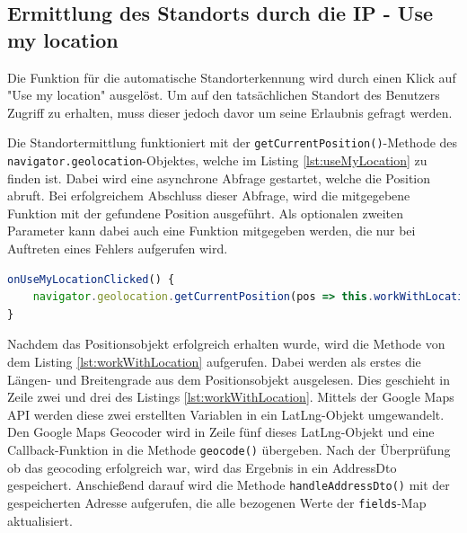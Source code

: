 \subsection{Ermittlung des Standorts durch die IP - Use my location}

Die Funktion für die automatische Standorterkennung wird durch einen Klick auf "Use my location" ausgelöst. Um auf den tatsächlichen Standort des Benutzers Zugriff zu erhalten, muss dieser jedoch davor um seine Erlaubnis gefragt werden.\autocite{useMyLocation}

Die Standortermittlung funktioniert mit der \texttt{getCurrentPosition()}-Methode des \\ \texttt{navigator.geolocation}-Objektes, welche im Listing \ref{lst:useMyLocation} zu finden ist. Dabei wird eine asynchrone Abfrage gestartet, welche die Position abruft. Bei erfolgreichem Abschluss dieser Abfrage, wird die mitgegebene Funktion mit der gefundene Position ausgeführt. Als optionalen zweiten Parameter kann dabei auch eine Funktion mitgegeben werden, die nur bei Auftreten eines Fehlers aufgerufen wird. \autocite{useMyLocation}

\begin{lstlisting}[caption={Die \texttt{onUseMyLocationClicked()}-Methode der \texttt{StreetComponent}-Klasse}, language=JavaScript,label={lst:useMyLocation}]
onUseMyLocationClicked() {
	navigator.geolocation.getCurrentPosition(pos => this.workWithLocation(pos, this));
}
\end{lstlisting}
\newpage
Nachdem das Positionsobjekt erfolgreich erhalten wurde, wird die Methode von dem Listing \ref{lst:workWithLocation} aufgerufen. Dabei werden als erstes die Längen- und Breitengrade aus dem Positionsobjekt ausgelesen. Dies geschieht in Zeile zwei und drei des Listings \ref{lst:workWithLocation}. Mittels der Google Maps API werden diese zwei erstellten Variablen in ein LatLng-Objekt umgewandelt.\autocite{latLngObjekt} Den Google Maps Geocoder wird in Zeile fünf dieses LatLng-Objekt und eine Callback-Funktion in die Methode \texttt{geocode()} übergeben. Nach der Überprüfung ob das geocoding erfolgreich war, wird das Ergebnis in ein AddressDto gespeichert. Anschießend darauf wird die Methode \texttt{handleAddressDto()} mit der gespeicherten Adresse aufgerufen, die alle bezogenen Werte der \texttt{fields}-Map aktualisiert.

